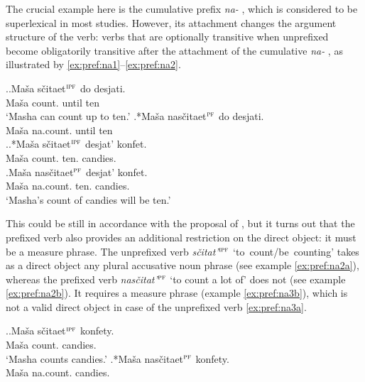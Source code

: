 The crucial example here is the cumulative  prefix \textit{na-} , which is considered to be superlexical in most studies. However, its attachment changes the argument structure of the verb: verbs that are optionally transitive when unprefixed become obligatorily transitive after the attachment of the cumulative  \textit{na-} , as illustrated by \ref{ex:pref:na1}--\ref{ex:pref:na2}.

\ex.\label{ex:pref:na1}\ag.\label{ex:pref:na1a}Ma\v{s}a s\v{c}itaet$^{\textsc{ipf}}$ do desjati.\\
Ma\v{s}a count. until ten\\
\trans `Masha can count up to ten.'
\bg.*Ma\v{s}a nas\v{c}itaet$^{\textsc{pf}}$ do desjati.\label{ex:pref:na1b}\\
Ma\v{s}a na.count. until ten\\

\ex.\label{ex:pref:na2}\ag.*Ma\v{s}a s\v{c}itaet$^{\textsc{ipf}}$ desjat' konfet.\label{ex:pref:na2a}\\
Ma\v{s}a count. ten. candies.\\
\bg.\label{ex:pref:na2b}Ma\v{s}a nas\v{c}itaet$^{\textsc{pf}}$ desjat' konfet.\\
Ma\v{s}a na.count. ten. candies.\\
\trans `Masha's count of candies will be ten.'

This could be still in accordance with the proposal of \citet{Tatevosov:09}, but it turns out that the prefixed verb also provides an additional restriction on the direct object: it must be a measure phrase. The unprefixed verb \textit{s\v{c}itat'}$^{\textsc{ipf}}$ \mbox{`to count/be counting'} takes as a direct object any plural accusative noun phrase  (see example \ref{ex:pref:na2a}), whereas the prefixed verb \textit{nas\v{c}itat'}$^{\textsc{pf}}$ `to count a lot of' does not (see example \ref{ex:pref:na2b}). It requires a measure phrase (example \ref{ex:pref:na3b}), which is not a valid direct object in case of the unprefixed verb \ref{ex:pref:na3a}. 

\ex.\label{ex:pref:na3}\ag.\label{ex:pref:na3a}Ma\v{s}a s\v{c}itaet$^{\textsc{ipf}}$ konfety.\\
Ma\v{s}a count. candies.\\
\trans `Masha counts candies.'
\bg.*Ma\v{s}a nas\v{c}itaet$^{\textsc{pf}}$ konfety.\label{ex:pref:na3b}\\
Ma\v{s}a na.count. candies.\\

